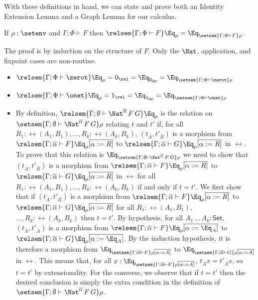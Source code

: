 \documentclass{lmcs}
\theoremstyle{plain}\newtheorem{satz}[thm]{Satz}
\newcommand{\set}{\mathsf{Set}}
\begin{document}
With these definitions in hand, we can state and prove both an
Identity Extension Lemma and a Graph Lemma for our calculus.
\begin{thm}[IEL]\label{thm:iel}
If $\rho : \setenv$ and $\Gamma; \Phi \vdash F$ then $\relsem{\Gamma;
  \Phi \vdash F} \Eq_\rho = \Eq_{\setsem{\Gamma; \Phi \vdash F}\rho}$.
\end{thm}
\proof
The proof is by induction on the structure of $F$. Only the $\Nat$,
application, and fixpoint cases are non-routine.
\begin{itemize}
\item $\relsem{\Gamma; \Phi \vdash \zerot} \Eq_{\rho} = 0_\rel =
  \Eq_{0_\set} = \Eq_{\setsem{\Gamma; \Phi \vdash \zerot}\rho}$
\item $\relsem{\Gamma; \Phi \vdash \onet} \Eq_{\rho} = 1_\rel =
  \Eq_{1_\set} = \Eq_{\setsem{\Gamma; \Phi \vdash \onet}\rho}$
\item By definition, $\relsem{\Gamma; \emptyset \vdash
  \Nat^{\overline\alpha} \,F\,G} \Eq_{\rho}$ is the relation on
  $\setsem{\Gamma; \emptyset \vdash \Nat^{\overline\alpha} \,F\,G}
  \rho$ relating $t$ and $t'$ if, for all ${R_1 :
    \rel(A_1,B_1)},...,{R_k : \rel(A_k,B_k)}$, $(t_{\overline{A}},
  t'_{\overline{B}})$ is a morphism from $\relsem{\Gamma;
    \overline\alpha \vdash F} \Eq_{\rho}\overline{[\alpha := R]}$ to
  $\relsem{\Gamma ; \overline\alpha \vdash G}
  \Eq_{\rho}\overline{[\alpha := R]}$ in $\rel$.  To prove that this
  relation is $\Eq_{\setsem{\Gamma; \emptyset \vdash
      \Nat^{\overline\alpha} \,F\,G} \rho}$ we need to show that
  $(t_{\overline{A}}, t'_{\overline{B}})$ is a morphism from
  $\relsem{\Gamma; \overline\alpha \vdash F}
  \Eq_{\rho}\overline{[\alpha := R]}$ to $\relsem{\Gamma ;
    \overline\alpha \vdash G} \Eq_{\rho}\overline{[\alpha := R]}$ in
  $\rel$ for all ${R_1 : \rel(A_1,B_1)},...,{R_k : \rel(A_k,B_k)}$ if
  and only if $t = t'$.  We first show that if $(t_{\overline{A}},
  t'_{\overline{B}})$ is a morphism from $\relsem{\Gamma;
    \overline\alpha \vdash F} \Eq_{\rho}\overline{[\alpha := R]}$ to
  $\relsem{\Gamma ; \overline\alpha \vdash G}
  \Eq_{\rho}\overline{[\alpha := R]}$ for all ${R_1 : \rel(A_1,B_1),}$
  $...,{R_k : \rel(A_k,B_k)}$ then $t = t'$.  By hypothesis, for all
  $A_1\,...\,A_k : \set$, $(t_{\overline{A}}, t'_{\overline{A}})$ is a
  morphism from $\relsem{\Gamma; \overline\alpha \vdash F}
  \Eq_{\rho}\overline{[\alpha := \Eq_{A}]}$ to $\relsem{\Gamma ;
    \overline\alpha \vdash G} \Eq_{\rho}\overline{[\alpha :=
      \Eq_{A}]}$. By the induction hypothesis, it is therefore a
  morphism from $\Eq_{\setsem{\Gamma; \overline\alpha \vdash F}
    \rho\overline{[\alpha := A]}}$ to $\Eq_{\setsem{\Gamma;
      \overline\alpha \vdash G} \rho\overline{[\alpha := A]}}$ in
  $\rel$. This means that, for all $x : \Eq_{\setsem{\Gamma;
      \overline\alpha \vdash F} \rho\overline{[\alpha := A]}}$,
  $t_{\overline{A}}x = t'_{\overline{A}}x$, so $t = t'$ by
  extensionality. For the converse, we observe that if $t = t'$ then
  the desired conclusion is simply the extra condition in the
  definition of $\setsem{\Gamma;\emptyset \vdash
    \Nat^{\overline\alpha} \,F\,G} \rho$.
 

\end{itemize}
\end{document}

